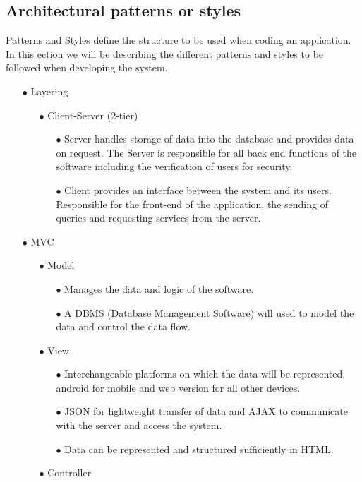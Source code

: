 \documentclass[a4paper,12pt]{article}
\begin{document}
\newpage
\subsection{Architectural patterns or styles}
Patterns and Styles define the structure to be used when coding an application. In this ection we will be describing the different patterns and styles to be followed when developing the system.
\begin{itemize}
	\item[$\bullet$]Layering 
		\begin{itemize}
		\item[$\bullet$]Client-Server (2-tier)
			\begin{itemize}
			\item[$\bullet$]Server handles storage of data into the database and provides data on request. The Server is responsible for all back end functions of the software including the verification of users for security.
			\item[$\bullet$]Client provides an interface between the system and its users. Responsible for the front-end of the application, the sending of queries and requesting services from the server.
			\end{itemize}
		\end{itemize}
		\item[$\bullet$] MVC
			\begin{itemize}
			\item[$\bullet$] Model
				\begin{itemize}
				\item[$\bullet$] Manages the data and logic of the software. 
				\item[$\bullet$] A DBMS (Database Management Software) will used to model the data and control the data flow.
				\end{itemize}
			\item[$\bullet$]View
				\begin{itemize}
				\item[$\bullet$]Interchangeable platforms on which the data will be represented,  android for mobile and web version for all other devices. 
				\item[$\bullet$]JSON for lightweight transfer of data and AJAX to communicate with the server and access the system. 
				\item[$\bullet$]Data can be represented and structured sufficiently in HTML.
				\end{itemize}
			\item[$\bullet$]Controller

\end{itemize}
\end{itemize}
\end{document}
